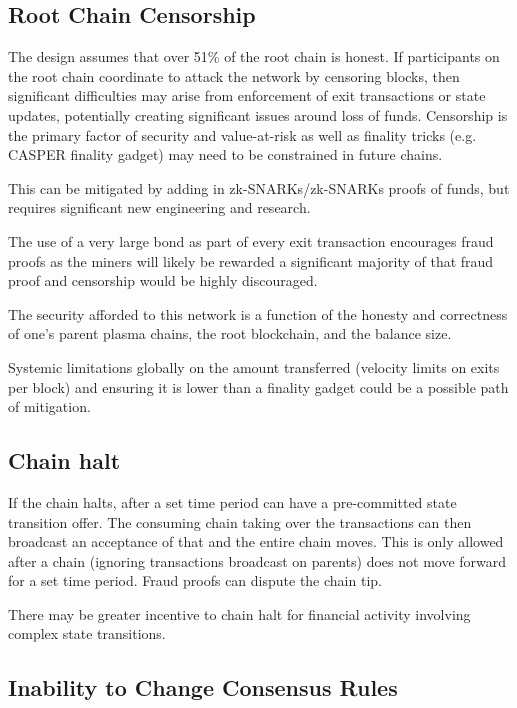 \documentclass[letterpaper, 11pt]{article}
\begin{document}
\subsection{Root Chain Censorship}

The design assumes that over 51\% of the root chain is honest. If participants
on the root chain coordinate to attack the network by censoring blocks, then
significant difficulties may arise from enforcement of exit transactions or
state updates, potentially creating significant issues around loss of funds.
Censorship is the primary factor of security and value-at-risk as well as
finality tricks (e.g. CASPER finality gadget) may need to be constrained in
future chains.

This can be mitigated by adding in zk-SNARKs/zk-SNARKs proofs of funds, but
requires significant new engineering and research.

The use of a very large bond as part of every exit transaction encourages fraud
proofs as the miners will likely be rewarded a significant majority of that
fraud proof and censorship would be highly discouraged.

The security afforded to this network is a function of the honesty and
correctness of one's parent plasma chains, the root blockchain, and the balance
size.

Systemic limitations globally on the amount transferred (velocity limits on
exits per block) and ensuring it is lower than a finality gadget could be a
possible path of mitigation.

\subsection{Chain halt}

If the chain halts, after a set time period can have a pre-committed state
transition offer. The consuming chain taking over the transactions can then
broadcast an acceptance of that and the entire chain moves. This is only
allowed after a chain (ignoring transactions broadcast on parents) does not
move forward for a set time period. Fraud proofs can dispute the chain tip.

There may be greater incentive to chain halt for financial activity involving
complex state transitions.

\subsection{Inability to Change Consensus Rules}
\end{document}

